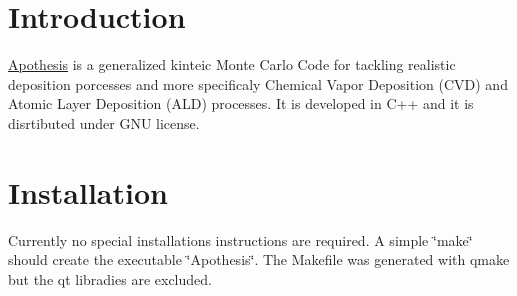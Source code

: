 \hypertarget{index_intro_sec}{}\section{Introduction}\label{index_intro_sec}
\mbox{\hyperlink{classApothesis}{Apothesis}} is a generalized kinteic Monte Carlo Code for tackling realistic deposition porcesses and more specificaly Chemical Vapor Deposition (C\+VD) and Atomic Layer Deposition (A\+LD) processes. It is developed in C++ and it is disrtibuted under G\+NU license.\hypertarget{index_install_sec}{}\section{Installation}\label{index_install_sec}
Currently no special installations instructions are required. A simple \char`\"{}make\char`\"{} should create the executable \char`\"{}\+Apothesis\char`\"{}. The Makefile was generated with qmake but the qt libradies are excluded. 